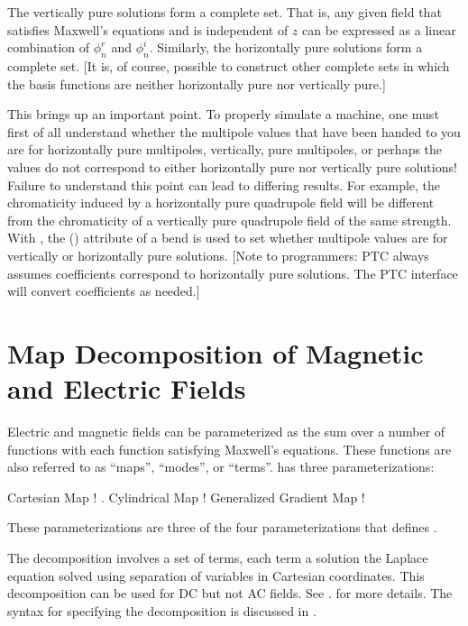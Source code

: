 The vertically pure solutions form a complete set. That is, any given field that satisfies
Maxwell's equations and is independent of $z$ can be expressed as a linear combination of
$\phi_n^r$ and $\phi_n^i$. Similarly, the horizontally pure solutions form a complete
set. [It is, of course, possible to construct other complete sets in which the basis
functions are neither horizontally pure nor vertically pure.]

This brings up an important point. To properly simulate a machine, one must first of all
understand whether the multipole values that have been handed to you are for horizontally
pure multipoles, vertically, pure multipoles, or perhaps the values do not correspond to
either horizontally pure nor vertically pure solutions! Failure to understand this point
can lead to differing results. For example, the chromaticity induced by a horizontally
pure quadrupole field will be different from the chromaticity of a vertically pure
quadrupole field of the same strength. With \bmad, the 
() attribute of a bend is used to set whether multipole values are for
vertically or horizontally pure solutions. [Note to programmers: PTC always assumes
coefficients correspond to horizontally pure solutions. The \bmad PTC interface will
convert coefficients as needed.]

\section{Map Decomposition of Magnetic and Electric Fields}
\label{s:field.map}

Electric and magnetic fields can be parameterized as the sum over a number of functions
with each function satisfying Maxwell's equations. These functions are also referred to as
``maps'', ``modes'', or ``terms''. \bmad has three parameterizations:
\begin{example}
  Cartesian Map              ! .
  Cylindrical Map            ! 
  Generalized Gradient Map   ! 
\end{example}
These parameterizations are three of the four  parameterizations that \bmad
defines .

The  decomposition involves a set of terms, each term a solution the
Laplace equation solved using separation of variables in Cartesian coordinates. This
decomposition can be used for DC but not AC fields. See .
for more details. The syntax for specifying the  decomposition
is discussed in .

